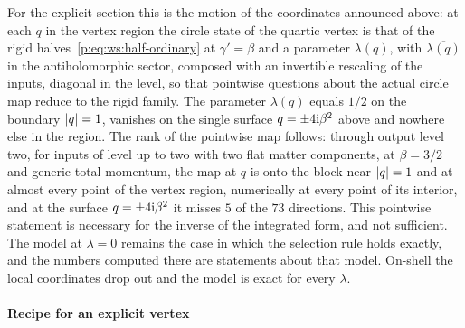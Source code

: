 For the explicit section this is the motion of the coordinates announced above: at each $q$ in the vertex region the circle state of the quartic vertex is that of the rigid halves~\eqref{p:eq:ws:half-ordinary} at $\gamma' = \beta$ and a parameter $\lambda(q)$, with $\overline{\lambda(q)}$ in the antiholomorphic sector, composed with an invertible rescaling of the inputs, diagonal in the level, so that pointwise questions about the actual circle map reduce to the rigid family.
The parameter $\lambda(q)$ equals $1 / 2$ on the boundary ${|q|} = 1$, vanishes on the single surface $q = \pm 4 \mathrm{i} \beta^2$ above and nowhere else in the region.
The rank of the pointwise map follows: through output level two, for inputs of level up to two with two flat matter components, at $\beta = 3 / 2$ and generic total momentum, the map at $q$ is onto the block near ${|q|} = 1$ and at almost every point of the vertex region, numerically at every point of its interior, and at the surface $q = \pm 4 \mathrm{i} \beta^2$ it misses $5$ of the $73$ directions.
This pointwise statement is necessary for the inverse of the integrated form, and not sufficient.
The model at $\lambda = 0$ remains the case in which the selection rule holds exactly, and the numbers computed there are statements about that model.
On-shell the local coordinates drop out and the model is exact for every $\lambda$.

\paragraph{Recipe for an explicit vertex}
\label{p:sec:ws:recipe}

